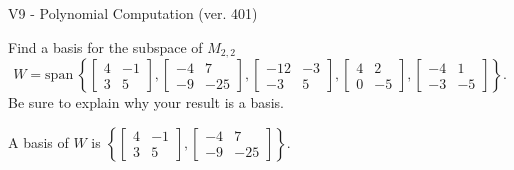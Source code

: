 \begin{exercise}
  \begin{exerciseTitle}V9 - Polynomial Computation (ver. 401)\end{exerciseTitle}
  \begin{exerciseStatement}
    Find a basis for the subspace of \(M_{2,2}\) 
\[W=\mathrm{span}\ \left\{\left[\begin{array}{cc}
4 & -1 \\
3 & 5
\end{array}\right] , \left[\begin{array}{cc}
-4 & 7 \\
-9 & -25
\end{array}\right] , \left[\begin{array}{cc}
-12 & -3 \\
-3 & 5
\end{array}\right] , \left[\begin{array}{cc}
4 & 2 \\
0 & -5
\end{array}\right] , \left[\begin{array}{cc}
-4 & 1 \\
-3 & -5
\end{array}\right]\right\}.\]
 Be sure to explain why your result is a basis.


  \end{exerciseStatement}
  \begin{exerciseAnswer}
   A basis of \(W\) is  \(\left\{\left[\begin{array}{cc}
4 & -1 \\
3 & 5
\end{array}\right] , \left[\begin{array}{cc}
-4 & 7 \\
-9 & -25
\end{array}\right]\right\}\).
  


  \end{exerciseAnswer}
\end{exercise}